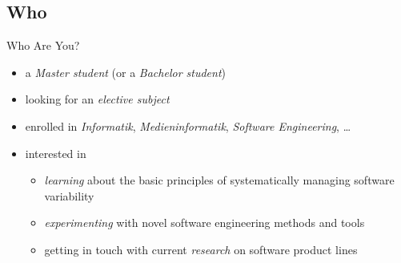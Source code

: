 \newcommand{\ulmMoodleLink}{https://moodle.uni-ulm.de/course/view.php?id=37352}
\newcommand{\ulmCalendarLink}{https://moodle.uni-ulm.de/calendar/view.php?view=upcoming&course=37352}
\newcommand{\ulmMoodle}{\href{\ulmMoodleLink}{Moodle}}

\subsection{Who}

\begin{frame}{\myframetitle}
	\begin{fancycolumns}[animation=none]
		\begin{example}{Who Are You?}
			\begin{itemize}
				\item a \emph{Master student} (or a \emph{Bachelor student})
				\item looking for an \emph{elective subject} 
				\item enrolled in \emph{Informatik}, \emph{Medieninformatik}, \emph{Software Engineering}, \ldots
				\item interested in
				\begin{itemize}
					\item \emph{learning} about the basic principles of systematically managing software variability
					\item \emph{experimenting} with novel software engineering methods and tools
					\item getting in touch with current \emph{research} on software product lines
				\end{itemize}
			\end{itemize}
		\end{example}
	\nextcolumn
	\end{fancycolumns}
\end{frame}

